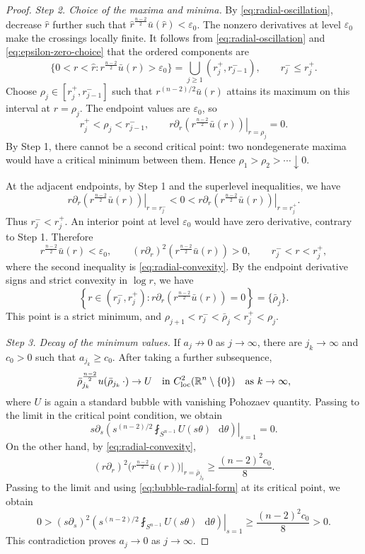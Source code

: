 \documentclass[11pt]{article}
\numberwithin{equation}{section}
\theoremstyle{remark}
\newcommand{\R}{\mathbb R}
\newcommand{\Sph}{S}
\newcommand{\pa}{\partial}
\newcommand{\eps}{\varepsilon}
\newcommand{\dd}{\mathop{}\!\mathrm{d}}
\begin{document}
\begin{proof}
\emph{Step 2. Choice of the maxima and minima.}
By \eqref{eq:radial-oscillation}, decrease \(\widehat r\) further such that \(\widehat r^{\frac{n-2}{2}}\bar u(\widehat r)<\eps_0\).
The nonzero derivatives at level \(\eps_0\) make the crossings locally
finite. {It follows from \eqref{eq:radial-oscillation} and
\eqref{eq:epsilon-zero-choice} that the ordered components are}
\[
 \{0<r<\widehat r:r^{\frac{n-2}{2}}\bar u(r)>\eps_0\}
 =\bigcup_{j\ge1}(r_j^+,r_{j-1}^-),
 \qquad r_j^-\le r_j^+.
\]
Choose \(\rho_j\in[r_j^+,r_{j-1}^-]\) such that \(r^{(n-2)/2}\bar u(r)\) attains its maximum on this interval at \(r=\rho_j\).
The endpoint values are \(\eps_0\), so
\[
 r_j^+<\rho_j<r_{j-1}^-,
 \qquad
 \left.r\pa_r(r^{\frac{n-2}{2}}\bar u(r))\right|_{r=\rho_j}=0.
\]
{By Step  1, there cannot be a second critical point: two
nondegenerate maxima would have a critical minimum between them.} Hence
\(\rho_1>\rho_2>\cdots\downarrow0\).

{At the adjacent endpoints, by Step  1 and the superlevel
inequalities, we have}
\[
 \left.r\pa_r(r^{\frac{n-2}{2}}\bar u(r))\right|_{r=r_j^-}
 <0<
 \left.r\pa_r(r^{\frac{n-2}{2}}\bar u(r))\right|_{r=r_j^+}.
\]
Thus \(r_j^-<r_j^+\). An interior point at level \(\eps_0\) would have
zero derivative, contrary to Step  1. Therefore
\[
 r^{\frac{n-2}{2}}\bar u(r)<\eps_0,\qquad
 (r\pa_r)^2(r^{\frac{n-2}{2}}\bar u(r))>0,
 \qquad r_j^-<r<r_j^+,
\]
where the second inequality is \eqref{eq:radial-convexity}.
{By the endpoint derivative signs and strict convexity in
\(\log r\), we have}
\[
 \left\{r\in(r_j^-,r_j^+):
 r\pa_r(r^{\frac{n-2}{2}}\bar u(r))=0\right\}
 =\{\bar\rho_j\}.
\]
This point is a strict minimum, and \(\rho_{j+1}<r_j^-<\bar\rho_j<r_j^+<\rho_j\).

\emph{Step 3. Decay of the minimum values.}
If \(a_j\not\to0\) as \(j\to\infty\), there are \(j_k\to\infty\) and
\(c_0>0\) such that \(a_{j_k}\ge c_0\). After taking a further subsequence,
\[
 \bar\rho_{j_k}^{\frac{n-2}{2}}
 u(\bar\rho_{j_k}\,\cdot)
 \to U
 \quad\text{in }C^2_{\rm loc}(\R^n\setminus\{0\})
 \quad\text{as }k\to\infty,
\]
where \(U\) is again a standard bubble with vanishing Pohozaev quantity.
{Passing to the limit in the critical point condition, we obtain}
\[
 \left.s\partial_s\left(s^{(n-2)/2}
 \fint_{\Sph^{n-1}}U(s\theta)\,\dd\theta\right)\right|_{s=1}=0.
\]
{On the other hand, by \eqref{eq:radial-convexity},}
\[
 (r\pa_r)^2\bigl(r^{\frac{n-2}{2}}\bar u(r)\bigr)
 \big|_{r=\bar\rho_{j_k}}
 \ge\frac{(n-2)^2c_0}{8}.
\]
{Passing to the limit and using
\eqref{eq:bubble-radial-form} at its critical point, we obtain}
\[
 0>\left.(s\partial_s)^2\left(s^{(n-2)/2}
 \fint_{\Sph^{n-1}}U(s\theta)\,\dd\theta\right)\right|_{s=1}
 \ge\frac{(n-2)^2c_0}{8}>0.
\]
This contradiction proves \(a_j \to 0\) as \(j\to\infty\).


\end{proof}
\end{document}
